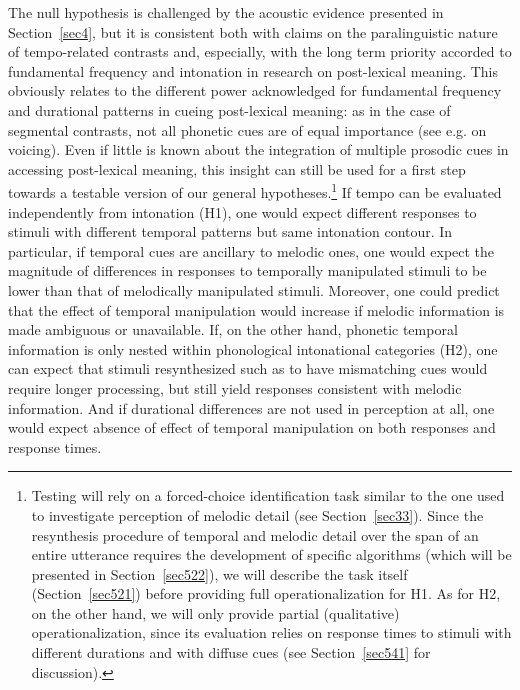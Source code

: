 The null hypothesis is challenged by the acoustic evidence presented in Section~\ref{sec4}, but it is consistent both with claims on the paralinguistic nature of tempo-related contrasts and, especially, with the long term priority accorded to fundamental frequency and intonation in research on post-lexical meaning. This obviously relates to the different power acknowledged for fundamental frequency and durational patterns in cueing post-lexical meaning: as in the case of segmental contrasts, not all phonetic cues are of equal importance (see e.g. \citealt{lisker1986voicing} on voicing). Even if little is known about the integration of multiple prosodic cues in accessing post-lexical meaning, this insight can still be used for a first step towards a testable version of our general hypotheses.\footnote{Testing will rely on a forced-choice identification task similar to the one used to investigate perception of melodic detail (see Section~\ref{sec33}). Since the resynthesis procedure of temporal and melodic detail over the span of an entire utterance requires the development of specific algorithms (which will be presented in Section~\ref{sec522}), we will describe the task itself (Section~\ref{sec521}) before providing full operationalization for H1. As for H2, on the other hand, we will only provide partial (qualitative) operationalization, since its evaluation relies on response times to stimuli with different durations and with diffuse cues (see Section~\ref{sec541} for discussion).}
If tempo can be evaluated independently from intonation (H1), one would expect different responses to stimuli with different temporal patterns but same intonation contour. In particular, if temporal cues are ancillary to melodic ones, one would expect the magnitude of differences in responses to temporally manipulated stimuli to be lower than that of melodically manipulated stimuli. Moreover, one could predict that the effect of temporal manipulation would increase if melodic information is made ambiguous or unavailable. If, on the other hand, phonetic temporal information is only nested within phonological intonational categories (H2), one can expect that stimuli resynthesized such as to have mismatching cues would require longer processing, but still yield responses consistent with melodic information. And if durational differences are not used in perception at all, one would expect absence of effect of temporal manipulation on both responses and response times.
